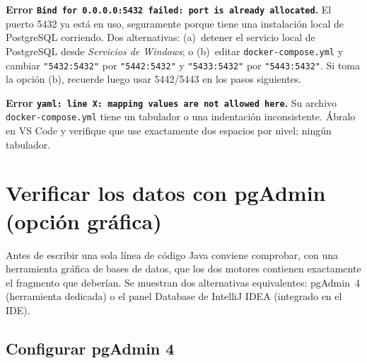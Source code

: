 \documentclass[11pt,a4paper]{article}
\begin{document}
\begin{errorbox}
\textbf{Error \texttt{Bind for 0.0.0.0:5432 failed: port is already allocated}.} El puerto 5432 ya est\'a en uso, seguramente porque tiene una instalaci\'on local de PostgreSQL corriendo. Dos alternativas: (a)~detener el servicio local de PostgreSQL desde \emph{Servicios de Windows}; o (b)~editar \texttt{docker-compose.yml} y cambiar \texttt{"5432:5432"} por \texttt{"5442:5432"} y \texttt{"5433:5432"} por \texttt{"5443:5432"}. Si toma la opci\'on (b), recuerde luego usar 5442/5443 en los pasos siguientes.

\textbf{Error \texttt{yaml: line X: mapping values are not allowed here}.} Su archivo \texttt{docker-compose.yml} tiene un tabulador o una indentaci\'on inconsistente. \'Abralo en VS Code y verifique que use exactamente dos espacios por nivel; ning\'un tabulador.
\end{errorbox}

\clearpage
\section{Verificar los datos con pgAdmin (opci\'on gr\'afica)}

Antes de escribir una sola l\'inea de c\'odigo Java conviene comprobar, con una herramienta gr\'afica de bases de datos, que los dos motores contienen exactamente el fragmento que deber\'ian. Se muestran dos alternativas equivalentes: pgAdmin~4 (herramienta dedicada) o el panel Database de IntelliJ IDEA (integrado en el IDE).

\subsection{Configurar pgAdmin 4}
\end{document}
